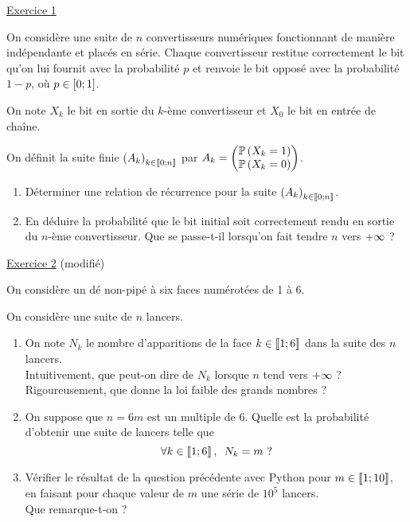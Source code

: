 \begin{exo}
\underline{Exercice 1}

On considère une suite de \(n\) convertisseurs numériques fonctionnant de manière indépendante et placés en série. Chaque convertisseur restitue correctement le bit qu'on lui fournit avec la probabilité \(p\) et renvoie le bit opposé avec la probabilité \(1-p\), où \(p\in\left[0;1\right]\).

On note \(X_k\) le bit en sortie du \(k\)-ème convertisseur et \(X_0\) le bit en entrée de chaîne.

On définit la suite finie \(\left(A_k\right)_{k\in\left\llbracket0;n\right\rrbracket}\) par \(A_k=\begin{pmatrix}\mathbb{P}\left(X_k=1\right)\\\mathbb{P}\left(X_k=0\right)\end{pmatrix}\).

\begin{enumerate}
    \item Déterminer une relation de récurrence pour la suite \(\left(A_k\right)_{k\in\left\llbracket0;n\right\rrbracket}\). \\
    \item En déduire la probabilité que le bit initial soit correctement rendu en sortie du \(n\)-ème convertisseur. Que se passe-t-il lorsqu'on fait tendre \(n\) vers \(+\infty\) ?
\end{enumerate}

\underline{Exercice 2} (modifié)

On considère un dé non-pipé à six faces numérotées de 1 à 6.

On considère une suite de \(n\) lancers.

\begin{enumerate}
    \item On note \(N_k\) le nombre d'apparitions de la face \(k\in\left\llbracket1;6\right\rrbracket\) dans la suite des \(n\) lancers. \\ Intuitivement, que peut-on dire de \(N_k\) lorsque \(n\) tend vers \(+\infty\) ? \\ Rigoureusement, que donne la loi faible des grands nombres ? \\
    \item On suppose que \(n=6m\) est un multiple de \(6\). Quelle est la probabilité d'obtenir une suite de lancers telle que \[\quantifs{\forall k\in\interventierii{1}{6}}N_k=m\text{ ?}\]
    \item Vérifier le résultat de la question précédente avec Python pour \(m\in\left\llbracket1;10\right\rrbracket\), en faisant pour chaque valeur de \(m\) une série de \(10^5\) lancers. \\ Que remarque-t-on ?
\end{enumerate}
\end{exo}

